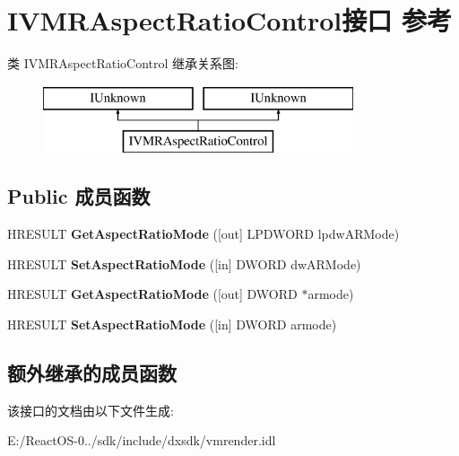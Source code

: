 \hypertarget{interface_i_v_m_r_aspect_ratio_control}{}\section{I\+V\+M\+R\+Aspect\+Ratio\+Control接口 参考}
\label{interface_i_v_m_r_aspect_ratio_control}
类 I\+V\+M\+R\+Aspect\+Ratio\+Control 继承关系图\+:\begin{figure}[H]
\begin{center}
\leavevmode
\includegraphics[height=2.000000cm]{interface_i_v_m_r_aspect_ratio_control}
\end{center}
\end{figure}
\subsection*{Public 成员函数}
\begin{DoxyCompactItemize}
\item 
\mbox{\label{interface_i_v_m_r_aspect_ratio_control_ad265f5640a52e00a64579046a72eaf02}} 
H\+R\+E\+S\+U\+LT {\bfseries Get\+Aspect\+Ratio\+Mode} (\mbox{[}out\mbox{]} L\+P\+D\+W\+O\+RD lpdw\+A\+R\+Mode)
\item 
\mbox{\label{interface_i_v_m_r_aspect_ratio_control_a220a96efa881f8cfe92e2c255371e27d}} 
H\+R\+E\+S\+U\+LT {\bfseries Set\+Aspect\+Ratio\+Mode} (\mbox{[}in\mbox{]} D\+W\+O\+RD dw\+A\+R\+Mode)
\item 
\mbox{\label{interface_i_v_m_r_aspect_ratio_control_a987cc33c7fe002f564184a7c3d048657}} 
H\+R\+E\+S\+U\+LT {\bfseries Get\+Aspect\+Ratio\+Mode} (\mbox{[}out\mbox{]} D\+W\+O\+RD $\ast$armode)
\item 
\mbox{\label{interface_i_v_m_r_aspect_ratio_control_add8dcce75d9651a8cfd2a4af4fb35e81}} 
H\+R\+E\+S\+U\+LT {\bfseries Set\+Aspect\+Ratio\+Mode} (\mbox{[}in\mbox{]} D\+W\+O\+RD armode)
\end{DoxyCompactItemize}
\subsection*{额外继承的成员函数}


该接口的文档由以下文件生成\+:\begin{DoxyCompactItemize}
\item 
E\+:/\+React\+O\+S-\/0../sdk/include/dxsdk/vmrender.\+idl\end{DoxyCompactItemize}
